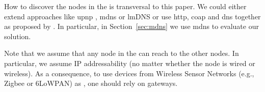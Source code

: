 How to discover the nodes in the \Space{} is transversal to this paper.
We could either extend approaches like \ac{upnp} , \ac{mdns}  or lmDNS \citep{jara_light-weight_2012} or use \acs{http}, \ac{coap}  and \ac{dns} together as proposed by \citet{ishaq_facilitating_2012}.
In particular, in Section~\ref{sec:mdns} we use \ac{mdns} to evaluate our solution.

Note that we assume that any node in the \Space{} can reach to the other nodes.
In particular, we assume IP addressability (no matter whether the node is wired or wireless).
As a consequence, to use devices from Wireless Sensor Networks (e.g., Zigbee or 6LoWPAN) as \providers{}, one should rely on gateways.



%
%


